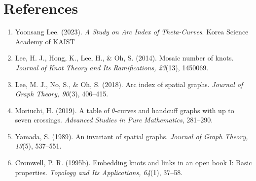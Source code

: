 \documentclass{article}
\theoremstyle{definition}
\theoremstyle{theorem}
\theoremstyle{proposition}
\theoremstyle{corollary}
\begin{document}
\section*{References}
    \begin{enumerate}
      \item Yoonsang Lee. (2023). \textit{A Study on Arc Index of Theta-Curves}. Korea Science Academy of KAIST
      \item Lee, H. J., Hong, K., Lee, H., \& Oh, S. (2014). Mosaic number of knots. \textit{Journal of Knot Theory and Its Ramifications, 23}(13), 1450069.
      \item Lee, M. J., No, S., \& Oh, S. (2018). Arc index of spatial graphs. \textit{Journal of Graph Theory, 90}(3), 406–415.
      \item Moriuchi, H. (2019). A table of $\theta$-curves and handcuff graphs with up to seven crossings. \textit{Advanced Studies in Pure Mathematics}, 281–290.
      \item Yamada, S. (1989). An invariant of spatial graphs. \textit{Journal of Graph Theory, 13}(5), 537–551.
      \item Cromwell, P. R. (1995b). Embedding knots and links in an open book I: Basic properties. \textit{Topology and Its Applications, 64}(1), 37–58.
    \end{enumerate}
\end{document}
